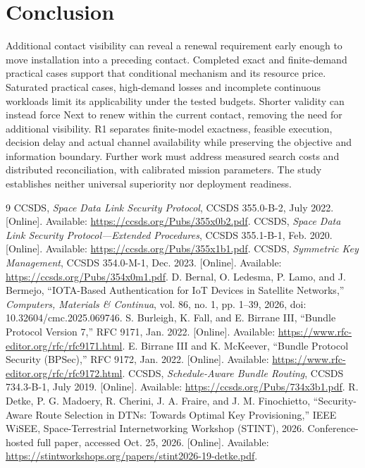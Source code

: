 \documentclass[conference]{IEEEtran}
\begin{document}
\section{Conclusion}
Additional contact visibility can reveal a renewal requirement early enough to move installation into a preceding contact. Completed exact and finite-demand practical cases support that conditional mechanism and its resource price. Saturated practical cases, high-demand losses and incomplete continuous workloads limit its applicability under the tested budgets. Shorter validity can instead force Next to renew within the current contact, removing the need for additional visibility. R1 separates finite-model exactness, feasible execution, decision delay and actual channel availability while preserving the objective and information boundary. Further work must address measured search costs and distributed reconciliation, with calibrated mission parameters. The study establishes neither universal superiority nor deployment readiness.

\begin{thebibliography}{9}
 CCSDS, \emph{Space Data Link Security Protocol}, CCSDS 355.0-B-2, July 2022. [Online]. Available: \url{https://ccsds.org/Pubs/355x0b2.pdf}.
 CCSDS, \emph{Space Data Link Security Protocol---Extended Procedures}, CCSDS 355.1-B-1, Feb. 2020. [Online]. Available: \url{https://ccsds.org/Pubs/355x1b1.pdf}.
 CCSDS, \emph{Symmetric Key Management}, CCSDS 354.0-M-1, Dec. 2023. [Online]. Available: \url{https://ccsds.org/Pubs/354x0m1.pdf}.
 D. Bernal, O. Ledesma, P. Lamo, and J. Bermejo, ``IOTA-Based Authentication for IoT Devices in Satellite Networks,'' \emph{Computers, Materials \& Continua}, vol. 86, no. 1, pp. 1--39, 2026, doi: 10.32604/cmc.2025.069746.
 S. Burleigh, K. Fall, and E. Birrane III, ``Bundle Protocol Version 7,'' RFC 9171, Jan. 2022. [Online]. Available: \url{https://www.rfc-editor.org/rfc/rfc9171.html}.
 E. Birrane III and K. McKeever, ``Bundle Protocol Security (BPSec),'' RFC 9172, Jan. 2022. [Online]. Available: \url{https://www.rfc-editor.org/rfc/rfc9172.html}.
 CCSDS, \emph{Schedule-Aware Bundle Routing}, CCSDS 734.3-B-1, July 2019. [Online]. Available: \url{https://ccsds.org/Pubs/734x3b1.pdf}.
 R. Detke, P. G. Madoery, R. Cherini, J. A. Fraire, and J. M. Finochietto, ``Security-Aware Route Selection in DTNs: Towards Optimal Key Provisioning,'' IEEE WiSEE, Space-Terrestrial Internetworking Workshop (STINT), 2026. Conference-hosted full paper, accessed Oct. 25, 2026. [Online]. Available: \url{https://stintworkshops.org/papers/stint2026-19-detke.pdf}.
\end{thebibliography}
\end{document}
